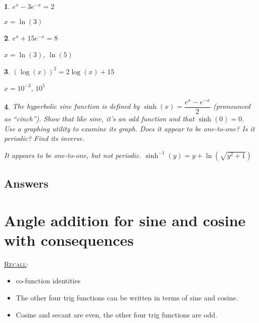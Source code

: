 \documentclass{amsbook}
\newtheorem{exc}{}
\newenvironment{ex}{\begin{exc}\normalfont}{\end{exc}}
\numberwithin{section}{chapter}
\numberwithin{equation}{chapter}
\newcommand{\qi}[1]{\begin{itemize}\item #1 \end{itemize}}
\begin{document}
\begin{multicols}{2}
\begin{ex}
	 $e^{x}-3e^{-x}=2$ %
	\begin{sol}
		 $x=\ln(3)$
	\end{sol}
\end{ex}

\begin{ex}
	 $e^{x}+15e^{-x}=8$ %
	\begin{sol}
		$x=\ln(3)$, $\ln(5)$
	\end{sol}
\end{ex}

\begin{ex}
	 $\left(\log(x)\right)^2=2\log(x)+15$
	\begin{sol}
		 $x=10^{-3}, \, 10^{5}$
	\end{sol}
\end{ex}

\end{multicols}

\begin{ex}
	The hyperbolic sine function is defined by $\sinh(x) = \dfrac{e^x-e^{-x}}{2}$ (pronounced as ``cinch''). Show that like sine, it's an odd function and that $\sinh(0)=0$. Use a graphing utility to examine its graph. Does it appear to be one-to-one? Is it periodic? Find its inverse.
	\begin{sol}
		It appears to be one-to-one, but not periodic. $\sinh^{-1}(y) = y+\ln\left( \sqrt{y^2+1} \right)$
	\end{sol}
\end{ex}

\subsection*{Answers \nopunct} \hfill
\begin{multicols}{2}
	
\end{multicols}



\newpage
\section{Angle addition for sine and cosine with consequences}


\underline{\textsc{Recall}}:

\qi{co-function identities}
\qi{The other four trig functions can be written in terms of sine and cosine.}
\qi{Cosine and secant are even, the other four trig functions are odd.}
\end{document}
